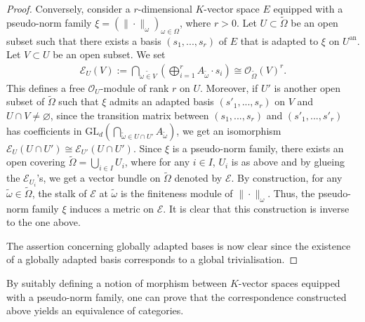 \documentclass [11pt,reqno]{amsart}
\newcommand{\1}{\mathmybb{1}}
\def\cE{{\mathcal{E}}}
\def\cO{{\mathcal{O}}}
\def\an{\operatorname{an}}
\def\tilde{\widetilde}
\def\emptyset{\varnothing}
\begin{document}
\begin{proof}
Conversely, consider a $r$-dimensional $K$-vector space $E$ equipped with a pseudo-norm family $\xi=(\|\cdot\|_{\omega})_{\omega\in\Omega}$, where $r>0$. Let $U\subset \tilde{\Omega}$ be an open subset such that there exists a basis $(s_{1},...,s_{r})$ of $E$ that is adapted to $\xi$ on $U^{\an}$. Let $V\subset U$ be an open subset. We set 
\begin{align*}
\cE_{U}(V):= \displaystyle\bigcap_{\tilde{\omega\in V}} \left(\bigoplus_{i=1}^{r}A_{\tilde{\omega}}\cdot s_{i}\right) \cong \cO_{\tilde{\Omega}}(V)^{r}.
\end{align*}
This defines a free $\cO_{U}$-module of rank $r$ on $U$. Moreover, if $U'$ is another open subset of $\tilde{\Omega}$ such that $\xi$ admits an adapted basis $(s'_{1},...,s_{r})$ on $V$ and $U\cap V\neq \emptyset$, since the transition matrix between $(s_{1},...,s_{r})$ and $(s'_{1},...,s'_{r})$ has coefficients in $\mathrm{GL}_{d}(\bigcap_{\tilde{\omega}\in U\cap U'}A_{\tilde{\omega}})$, we get an isomorphism $\cE_{U}(U\cap U')\cong \cE_{U'}(U\cap U')$. Since $\xi$ is a pseudo-norm family, there exists an open covering $\tilde{\Omega}=\bigcup_{i\in I} U_{i}$, where for any $i\in I$, $U_{i}$ is as above and by glueing the $\cE_{U_{i}}$'s, we get a vector bundle on $\tilde{\Omega}$ denoted by $\cE$. By construction, for any $\tilde{\omega}\in\tilde{\Omega}$, the stalk of $\cE$ at $\tilde{\omega}$ is the finiteness module of $\|\cdot\|_{\omega}$. Thus, the pseudo-norm family $\xi$ induces a metric on $\cE$. It is clear that this construction is inverse to the one above. 

The assertion concerning globally adapted bases is now clear since the existence of a globally adapted basis corresponds to a global trivialisation.
\end{proof}

\begin{remark}
\label{ZR_interpretation_pseudo-norm_families_equivalence_of_categories}
By suitably defining a notion of morphism between $K$-vector spaces equipped with a pseudo-norm family, one can prove that the correspondence constructed above yields an equivalence of categories. 
\end{remark}
\end{document}
